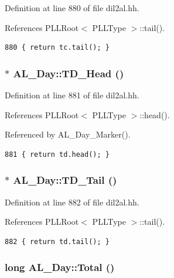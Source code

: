 Definition at line 880 of file dil2al.hh.

References PLLRoot$<$ PLLType $>$::tail().



\footnotesize\begin{verbatim}880 { return tc.tail(); }
\end{verbatim}\normalsize 
{}
\subsubsection{$\ast$ AL\_\-Day::TD\_\-Head ()\hspace{0.3cm}{\tt  [inline]}}\label{classAL__Day_a12}




Definition at line 881 of file dil2al.hh.

References PLLRoot$<$ PLLType $>$::head().

Referenced by AL\_\-Day\_\-Marker().



\footnotesize\begin{verbatim}881 { return td.head(); }
\end{verbatim}\normalsize 
{}
\subsubsection{$\ast$ AL\_\-Day::TD\_\-Tail ()\hspace{0.3cm}{\tt  [inline]}}\label{classAL__Day_a13}




Definition at line 882 of file dil2al.hh.

References PLLRoot$<$ PLLType $>$::tail().



\footnotesize\begin{verbatim}882 { return td.tail(); }
\end{verbatim}\normalsize 
{}
\subsubsection{\setlength{\rightskip}{0pt plus 5cm}long AL\_\-Day::Total ()\hspace{0.3cm}{\tt  [inline]}}\label{classAL__Day_a9}




